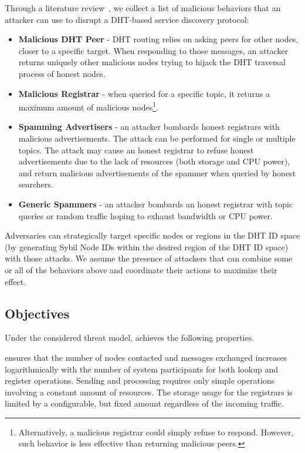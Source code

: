 Through a literature review~\cite{chen2020survey, henningsen2019eclipsing}, we collect a list of malicious behaviors that an attacker can use to disrupt a DHT-based service discovery protocol:
\begin{itemize}
    \item \textbf{Malicious DHT Peer} - DHT routing relies on asking peers for other nodes, closer to a specific target. When responding to those messages, an attacker returns uniquely other malicious nodes trying to hijack the DHT traversal process of honest nodes.
    \item \textbf{Malicious Registrar} - when queried for a specific topic, it returns a maximum amount of malicious nodes\footnote{Alternatively, a malicious registrar could simply refuse to respond. However, such behavior is less effective than returning malicious peers.}. 
    \item \textbf{Spamming Advertisers} - an attacker bombards honest registrars with malicious advertisements. The attack can be performed for single or multiple topics. The attack may cause an honest registrar to refuse honest advertisements due to the lack of resources (both storage and CPU power), and return malicious advertisements of the spammer when queried by honest searchers. 
    \item \textbf{Generic Spammers} - an attacker bombards an honest registrar with topic queries or random traffic hoping to exhaust bandwidth or CPU power.
\end{itemize}

Adversaries can strategically target specific nodes or regions in the DHT ID space (\ie by generating Sybil Node IDs within the desired region of the DHT ID space) with those attacks. We assume the presence of attackers that can combine some or all of the behaviors above and coordinate their actions to maximize their effect. 

\subsection{Objectives}
Under the considered threat model, \sysname achieves the following properties.

 \sysname ensures that the number of nodes contacted and messages exchanged increases logarithmically with the number of system participants for both lookup and register operations. Sending and processing requires only simple operations involving a constant amount of resources. The storage usage for the registrars is limited by a configurable, but fixed amount regardless of the incoming traffic. 

